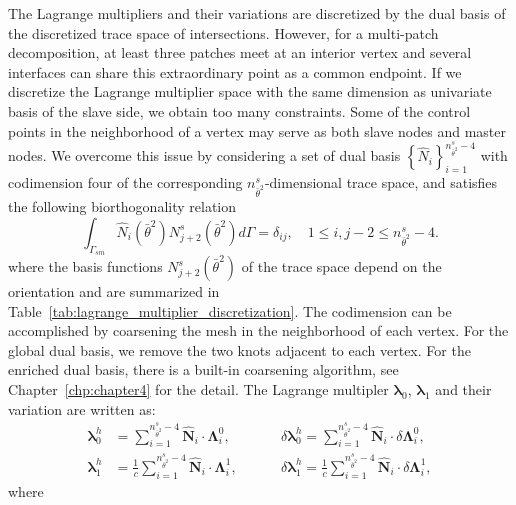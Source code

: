 The Lagrange multipliers and their variations are discretized by the dual basis of the discretized trace space of intersections. However, for a multi-patch decomposition, at least three patches meet at an interior vertex and several interfaces can share this extraordinary point as a common endpoint. If we discretize the Lagrange multiplier space with the same dimension as univariate basis of the slave side, we obtain too many constraints. Some of the control points in the neighborhood of a vertex may serve as both slave nodes and master nodes. We overcome this issue by considering a set of dual basis $\left\{\hat{N}_i\right\}_{i=1}^{n^s_{\bar{\theta}^2}-4}$ with codimension four of the corresponding $n^s_{\bar{\theta}^2}$-dimensional trace space, and satisfies the following biorthogonality relation
\begin{equation}
	\int_{\Gamma_{sm}} \hat{N}_{i}({\bar{\theta}^2})N^s_{j+2}({\bar{\theta}^2}) d \Gamma = \delta_{ij}, \quad 1\leq i,j-2\leq  n^s_{\bar{\theta}^2}-4.
\end{equation}
where the basis functions $N^s_{j+2}({\bar{\theta}^2})$ of the trace space depend on the orientation and are summarized in Table~\ref{tab:lagrange_multiplier_discretization}. The codimension can be accomplished by coarsening the mesh in the neighborhood of each vertex. For the global dual basis, we remove the two knots adjacent to each vertex. For the enriched \Bezier dual basis, there is a built-in coarsening algorithm, see Chapter~\ref{chp:chapter4} for the detail. The Lagrange multipler $\boldsymbol{\lambda}_0$, $\boldsymbol{\lambda}_1$ and their variation are written as:
\begin{equation}
	\begin{alignedat}{2}
		\boldsymbol{\lambda}_0^h & = \sum_{i=1}^{n^s_{\bar{\theta}^2}-4} \hat{\mathbf{N}}_i\cdot\boldsymbol{\Lambda}^0_i,\quad\quad && \delta\boldsymbol{\lambda}_0^h            = \sum_{i=1}^{n^s_{\bar{\theta}^2}-4} \hat{\mathbf{N}}_i\cdot\delta\boldsymbol{\Lambda}^0_i,            \\
		\boldsymbol{\lambda}_1^h & = \frac{1}{c}\sum_{i=1}^{n^s_{\bar{\theta}^2}-4} \hat{\mathbf{N}}_i\cdot\boldsymbol{\Lambda}^1_i,\quad  &&\delta\boldsymbol{\lambda}_1^h = \frac{1}{c}\sum_{i=1}^{n^s_{\bar{\theta}^2}-4} \hat{\mathbf{N}}_i\cdot\delta\boldsymbol{\Lambda}^1_i,
	\end{alignedat}
\end{equation}
where
